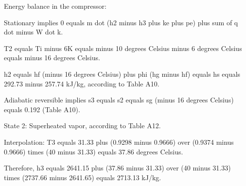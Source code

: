Energy balance in the compressor:

Stationary implies 0 equals m dot (h2 minus h3 plus ke plus pe) plus sum of q dot minus W dot k.

T2 equals Ti minus 6K equals minus 10 degrees Celsius minus 6 degrees Celsius equals minus 16 degrees Celsius.

h2 equals hf (minus 16 degrees Celsius) plus phi (hg minus hf) equals hs equals 292.73 minus 257.74 kJ/kg, according to Table A10.

Adiabatic reversible implies s3 equals s2 equals sg (minus 16 degrees Celsius) equals 0.192 (Table A10).

State 2: Superheated vapor, according to Table A12.

Interpolation: T3 equals 31.33 plus (0.9298 minus 0.9666) over (0.9374 minus 0.9666) times (40 minus 31.33) equals 37.86 degrees Celsius.

Therefore, h3 equals 2641.15 plus (37.86 minus 31.33) over (40 minus 31.33) times (2737.66 minus 2641.65) equals 2713.13 kJ/kg.
